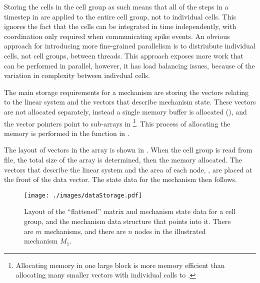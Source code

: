 \begin{note}
Storing the cells in the cell group as such means that all of the steps in a timestep in  are applied to the entire cell group, not to individual cells.
This ignores the fact that the cells can be integrated in time independently, with coordination only required when communicating spike events.
An obvious approach for introducing more fine-grained parallelism is to distriubute individual cells, not cell groups, between threads.
This approach exposes more work that can be performed in parallel, however, it has load balancing issues, because of the variation in complexity between indivdual cells.
\end{note}

The main storage requirements for a mechanism are storing the vectors relating to the linear system and the vectors that describe mechanism state.
These vectors are not allocated separately, instead a single memory buffer is allocated (), and the vector pointers point to sub-arrays in 
\footnote{
Allocating memory in one large block is more memory efficient than allocating many smaller vectors with individual calls to .
}.
This process of allocating the memory is performed in the function  in .

The layout of vectors in the  array is shown in .
When the cell group is read from file, the total size of the  array is determined, then the memory allocated.
The vectors that describe the linear system and the area of each node, , are placed at the front of the data vector.
The state data for the mechanism then follows.

\begin{figure}[htp!]
\centering
\texttt{[image: ./images/dataStorage.pdf]}
\caption{Layout of the ``flattened'' matrix and mechanism state data for a cell group, and the mechanism data structure that points into it. There are $m$ mechanisms, and there are $n$ nodes in the illustrated mechanism $M_1$.}
\label{fig:dataLayout}
\end{figure}

